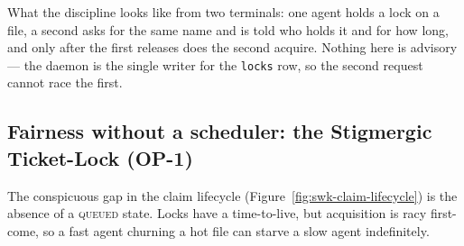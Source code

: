 \documentclass[11pt,a4paper]{article}
\theoremstyle{definition}
\theoremstyle{remark}
\begin{document}
What the discipline looks like from two terminals: one agent holds a lock on a file,
a second asks for the same name and is told who holds it and for how long, and only
after the first releases does the second acquire. Nothing here is advisory --- the
daemon is the single writer for the \texttt{locks} row, so the second request cannot
race the first.



\subsection{Fairness without a scheduler: the Stigmergic Ticket-Lock (OP-1)}
\label{sec:op1}

The conspicuous gap in the claim lifecycle (Figure~\ref{fig:swk-claim-lifecycle}) is
the absence of a \textsc{queued} state. Locks have a time-to-live, but acquisition is
racy first-come, so a fast agent churning a hot file can starve a slow agent
indefinitely.

\ifdefined\pdswisslandmarkplate
\begin{figure}[p]
  \centering
\end{figure}
\fi
\end{document}

